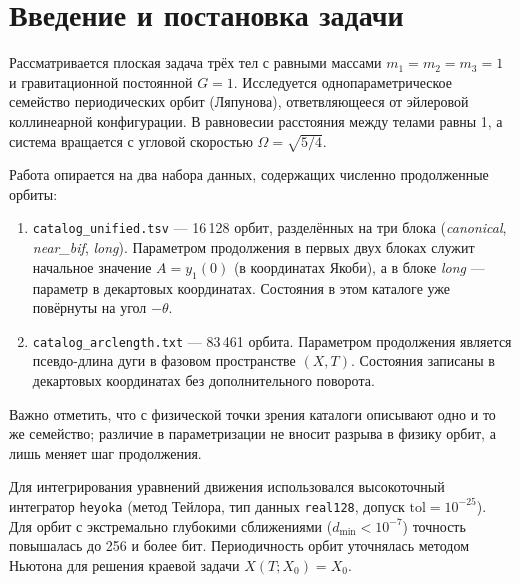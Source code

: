 \section{Введение и постановка задачи}

Рассматривается плоская задача трёх тел с равными массами \(m_1 = m_2 = m_3 = 1\) и гравитационной постоянной \(G = 1\). Исследуется однопараметрическое семейство периодических орбит (Ляпунова), ответвляющееся от эйлеровой коллинеарной конфигурации. В равновесии расстояния между телами равны 1, а система вращается с угловой скоростью \(\Omega = \sqrt{5/4}\).

Работа опирается на два набора данных, содержащих численно продолженные орбиты:
\begin{enumerate}
    \item \texttt{catalog\_unified.tsv} — 16\,128 орбит, разделённых на три блока (\textit{canonical}, \textit{near\_bif}, \textit{long}). Параметром продолжения в первых двух блоках служит начальное значение \(A = y_1(0)\) (в координатах Якоби), а в блоке \textit{long} — параметр в декартовых координатах. Состояния в этом каталоге уже повёрнуты на угол \(-\theta\).
    \item \texttt{catalog\_arclength.txt} — 83\,461 орбита. Параметром продолжения является псевдо-длина дуги в фазовом пространстве \((X, T)\). Состояния записаны в декартовых координатах без дополнительного поворота.
\end{enumerate}
Важно отметить, что с физической точки зрения каталоги описывают одно и то же семейство; различие в параметризации не вносит разрыва в физику орбит, а лишь меняет шаг продолжения.

Для интегрирования уравнений движения использовался высокоточный интегратор \texttt{heyoka} (метод Тейлора, тип данных \texttt{real128}, допуск \(\text{tol} = 10^{-25}\)). Для орбит с экстремально глубокими сближениями (\(d_{\min} < 10^{-7}\)) точность повышалась до 256 и более бит. Периодичность орбит уточнялась методом Ньютона для решения краевой задачи \(X(T; X_0) = X_0\).
